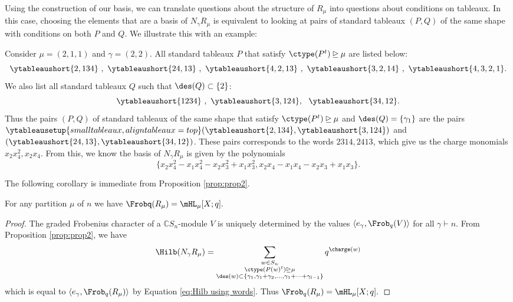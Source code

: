 Using the construction of our basis, we can translate questions about the structure of $R_{\mu}$ into questions about conditions on tableaux.
In this case, choosing the elements that are a basis of $N_\gamma R_{\mu}$ is equivalent to looking at pairs of standard tableaux $(P,Q)$ of the same shape with conditions on both $P$ and $Q$. 
We illustrate this with an example:
\begin{ex}
Consider $\mu= (2,1,1)$ and $\gamma = (2,2)$. All standard tableaux $P$ that satisfy $\ctype(P^t) \unrhd \mu$ are listed below:
\[\ytableaushort{2,134} \ , \  \ytableaushort{24,13} \ , \ \ytableaushort{4,2,13} \ , \  \ytableaushort{3,2,14}\ , \ \ytableaushort{4,3,2,1}. \]
We also list all standard tableaux $Q$ such that $\des(Q) \subset \{2\}$:
\[\ytableaushort{1234} \ , \  \ytableaushort{3,124}, \ \ \ytableaushort{34,12}. \]
Thus the pairs $(P,Q)$ of standard tableaux of the same shape that satisfy $\ctype(P^t) \unrhd \mu$ and $\des(Q) = \{\gamma_1\}$ are the pairs $ \ytableausetup{smalltableaux,  aligntableaux = top}(\ytableaushort{2,134},\ytableaushort{3,124})$ and $(\ytableaushort{24,13},\ytableaushort{34,12})$.
These pairs corresponds to the words $2314, 2413$, which give us the charge monomials $x_2x_4^2, x_2x_4.$
From this, we know the basis of $N_\gamma R_{\mu}$ is given by the polynomials
\[\{ x_2x_4^2 - x_1x_4^2 - x_2x_3^2 + x_1x_3^2, x_2x_4 - x_1x_4 - x_2x_3 + x_1x_3 \}.\]

\end{ex}

The following corollary is immediate from Proposition \ref{prop:prop2}.

\begin{coro}
For any partition $\mu$ of $n$ we have $\Frobq(R_{\mu}) =\mHL_{\mu}[X;q].$
\end{coro}
\begin{proof}
The graded Frobenius character of a $\mathbb{C}S_n$-module $V$ is uniquely determined by the values $\langle e_\gamma , \Frob_q(V)\rangle$ for all $\gamma\vdash n$.
From Proposition \ref{prop:prop2}, we have
\[\Hilb(N_\gamma R_{\mu})  = \sum\limits_{\substack{w\in S_n\\  \ctype(P(w)^t)\unrhd\mu \\ \des(w) \subset \{\gamma_1,\gamma_1 + \gamma_2, \dots, \gamma_1 +\cdots + \gamma_{l-1}\} }}  q^{\charge(w)} \]
which is equal to $\langle e_\gamma , \Frob_q(R_{\mu})\rangle$ by Equation \eqref{eq:Hilb using words}. Thus $\Frob_q(R_{\mu}) = \mHL_{\mu}[X;q].$
\end{proof}

